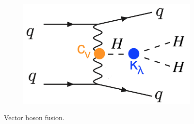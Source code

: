\begin{figure}[ht]
\begin{subfigure}[b]{0.35\textwidth}
            \includegraphics[width=\textwidth]{MSc_Thesis/fig/vbf3.png}
            \vspace{-0.5cm}
        \end{subfigure}
        \caption[]
        {\small Vector boson fusion.}
\end{figure}